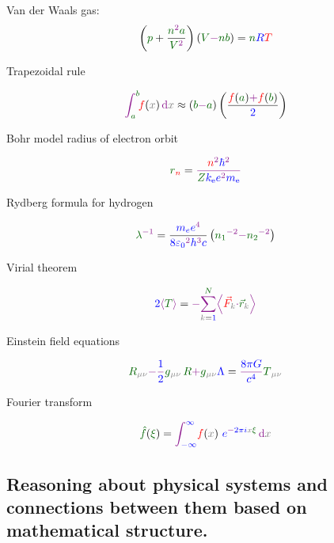 \documentclass[12pt,letterpaper]{article}
\begin{document}
Van der Waals gas:
\[
\left(
  \fv{p}
  +
  \frac{
    \fv{n}^{\op{2}}
    \fv{a}
  }{
    \fv{V}^{\op{2}}
  }
\right)
\left(
  \fv{V}
  \op{-}
  \fv{n}
  \fv{b}
\right)
=
\fv{n}
\fc{R}
\iv{T}
\]

Trapezoidal rule

\[
\op{
  \int_{
    \fv{a}
  }^{
    \fv{b}
  }
}
\! %
\iv{f}(\bv{x})
\, %
\op{\mathrm{d}} \bv{x}
\approx
(
  \fv{b}
  \op{-}
  \fv{a}
)
\left(
  \frac{
    \iv{f}(\fv{a})
    \op{+}
    \iv{f}(\fv{b})
  }{
    \fc{2}
  }
\right)
\]

Bohr model radius of electron orbit

\[
\fv{r}_{\iv{n}}
=
\op{\frac{
  \iv{n}^{\op{2}}
  \fc{\hbar}^{\op{2}}
}{
  \fv{Z}
  \fc{k_\mathrm{e}}
  \fc{e}^{\op{2}}
  \fc{m_\mathrm{e}}
}}
\]

Rydberg formula for hydrogen

\[
\fv{\lambda}^{\op{-1}}
=
\frac{
  \fc{m_e}
  \fc{e}^{\op{4}}
}{
  \fc{8}
  \fc{\varepsilon_0}^{\op{2}}
  \fc{h}^{\op{3}}
  \fc{c}
}
\left(
  \fv{n_1}^{\op{-2}}
  \op{-}
  \fv{n_2}^{\op{-2}}
\right)
\]

Virial theorem

\[
\fc{2}
\op{
  \left\langle
    \fv{T}
  \right\rangle
}
=
\op{-}
\op{
  \sum_{
    \bv{k} \textcolor{black}{= \fc{1}}
  }^{
    \fv{N}
  }
}
\op{
  \left\langle
    \iv{\vec{F}_{\bv{k}}}
    \op{\cdot}
    \fv{\vec{r}_{\bv{k}}}
  \right\rangle
}
\]

Einstein field equations

\[
\fv{R}_{\bv{\mu} \bv{\nu}}
\op{-}
\op{\frac{\fc{1}}{\fc{2}}}
\fv{g}_{\bv{\mu} \bv{\nu}} \, \fv{R}
\op{+}
\fv{g}_{\bv{\mu} \bv{\nu}} \fc{\Lambda}
=
\op{\frac{\fc{8 \pi G}}{\fc{c^4}}}
\fv{T}_{\bv{\mu} \bv{\nu}}
\]

Fourier transform

\[
\fv{\hat{f}}
  (\fv{\xi})
=
\op{\int_{\fc{-\infty}}^{\fc{\infty}}}
  \iv{f}(\bv{x})
  \ \fc{e}^{\op{-} \fc{2\pi i} \bv{x} \fv{\xi}}
  \,
  \op{\mathrm{d}} \bv{x}
\]


\unboldmath




\subsection{Reasoning about physical systems and connections between them based on mathematical structure.}
\end{document}

